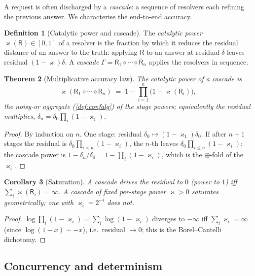 \documentclass[11pt,a4paper]{article}
\theoremstyle{plain}
\newtheorem{theorem}{Theorem}[section]
\newtheorem{corollary}[theorem]{Corollary}
\theoremstyle{definition}
\newtheorem{definition}[theorem]{Definition}
\theoremstyle{remark}
\newcommand{\Unit}{[0,1]}
\newcommand{\nor}{\oplus}
\newcommand{\catp}{\varkappa}              %
\newcommand{\Res}{\mathsf{R}}              %
\begin{document}
A request is often discharged by a \emph{cascade}: a sequence of resolvers each
refining the previous answer. We characterise the end-to-end accuracy.

\begin{definition}[Catalytic power and cascade]
\label{def:cascade}
The \emph{catalytic power} $\catp(\Res)\in\Unit$ of a resolver is the fraction
by which it reduces the residual distance of an answer to the truth: applying
$\Res$ to an answer at residual $\delta$ leaves residual $(1-\catp)\delta$. A
\emph{cascade} $\Gamma=\Res_1\diamond\cdots\diamond\Res_n$ applies the resolvers
in sequence.
\end{definition}

\begin{theorem}[Multiplicative accuracy law]
\label{thm:cascade}
The catalytic power of a cascade is
\[
\catp(\Res_1\diamond\cdots\diamond\Res_n)\;=\;1-\prod_{i=1}^{n}\big(1-
\catp(\Res_i)\big),
\]
the noisy-or aggregate (\cref{def:confalg}) of the stage powers; equivalently the
residual multiplies, $\delta_n=\delta_0\prod_i(1-\catp_i)$.
\end{theorem}
\begin{proof}
By induction on $n$. One stage: residual $\delta_0\mapsto(1-\catp_1)\delta_0$.
If after $n-1$ stages the residual is $\delta_0\prod_{i<n}(1-\catp_i)$, the
$n$-th leaves $\delta_0\prod_{i\le n}(1-\catp_i)$; the cascade power is
$1-\delta_n/\delta_0=1-\prod_i(1-\catp_i)$, which is the $\nor$-fold of the
$\catp_i$.
\end{proof}

\begin{corollary}[Saturation]
\label{cor:saturation}
A cascade drives the residual to $0$ (power to $1$) iff $\sum_i\catp(\Res_i)=
\infty$. A cascade of fixed per-stage power $\catp>0$ saturates geometrically;
one with $\catp_i=2^{-i}$ does not.
\end{corollary}
\begin{proof}
$\log\prod_i(1-\catp_i)=\sum_i\log(1-\catp_i)$ diverges to $-\infty$ iff
$\sum_i\catp_i=\infty$ (since $\log(1-x)\sim-x$), i.e.\ residual $\to0$; this is
the Borel--Cantelli dichotomy.
\end{proof}

\subsection{Concurrency and determinism}
\end{document}
